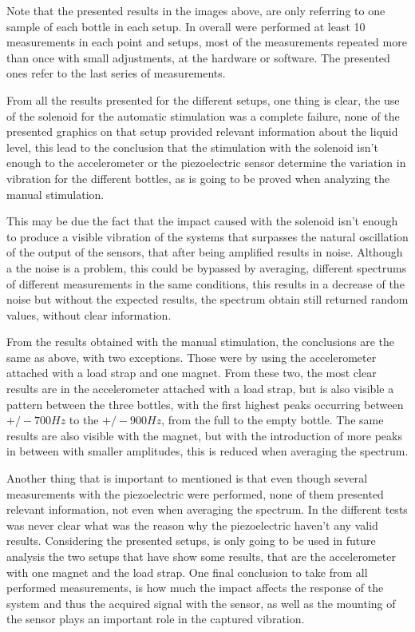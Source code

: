 Note that the presented results in the images above, are only referring to one sample of each bottle in each setup. In overall were performed at least 10 measurements in each point and setups, most of the measurements repeated more than once with small adjustments, at the hardware or software. The presented ones refer to the last series of measurements. %

From all the results presented for the different setups, one thing is clear, the use of the solenoid for the automatic stimulation was a complete failure, none of the presented graphics on that setup provided relevant information about the liquid level, this lead to the conclusion that the stimulation with the solenoid isn't enough to the accelerometer or the piezoelectric sensor determine the variation in vibration for the different bottles, as is going to be proved when analyzing the manual stimulation. 

This may be due the fact that the impact caused with the solenoid isn't enough to produce a visible vibration of the systems that surpasses the natural oscillation of the output of the sensors, that after being amplified results in noise. Although a the noise is a problem, this could be bypassed by averaging, different spectrums of different measurements in the same conditions, this results in a decrease of the noise but without the expected results, the spectrum obtain still returned random values, without clear information.

From the results obtained with the manual stimulation, the conclusions are the same as above, with two exceptions. Those were by using the accelerometer attached with a load strap and one magnet. From these two, the most clear results are in the accelerometer attached with a load strap, but is also visible a pattern between the three bottles, with the first highest peaks occurring between $+/- 700Hz$ to the $+/-900Hz$, from the full to the empty bottle. The same results are also visible with the magnet, but with the introduction of more peaks in between with smaller amplitudes, this is reduced when averaging the spectrum.

Another thing that is important to mentioned is that even though several measurements with the piezoelectric were performed, none of them presented relevant information, not even when averaging the spectrum. In the different tests was never clear what was the reason why the piezoelectric haven't any valid results. 
Considering the presented setups, is only going to be used in future analysis the two setups that have show some results, that are the accelerometer with one magnet and the load strap. One final conclusion to take from all performed measurements, is how much the impact affects the response of the system and thus the acquired signal with the sensor, as well as the mounting of the sensor plays an important role in the captured vibration.
